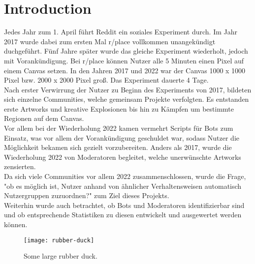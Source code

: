 \section{Introduction} \label{introduction}

Jedes Jahr zum 1. April f{\"u}hrt Reddit ein soziales Experiment durch. Im Jahr 2017 wurde dabei zum ersten Mal r/place vollkommen unangekündigt duchgeführt. Fünf Jahre später wurde das gleiche Experiment wiederholt, jedoch mit Vorankündigung. Bei r/place k{\"o}nnen Nutzer alle 5 Minuten einen Pixel auf einem Canvas setzen. In den Jahren 2017 und 2022 war der Canvas 1000 x 1000 Pixel bzw. 2000 x 2000 Pixel gro{\ss}. Das Experiment dauerte 4 Tage. \\
Nach erster Verwirrung der Nutzer zu Beginn des Experiments von 2017, bildeten sich einzelne Communities, welche gemeinsam Projekte verfolgten. Es entstanden erste Artworks und kreative Explosionen bis hin zu Kämpfen um bestimmte Regionen auf dem Canvas.\\
Vor allem bei der Wiederholung 2022 kamen vermehrt Scripts für Bots zum Einsatz, was vor allem der Vorankündigung geschuldet war, sodass Nutzer die Möglichkeit bekamen sich gezielt vorzubereiten. Anders als 2017, wurde die Wiederholung 2022 von Moderatoren begleitet, welche unerwünschte Artworks zensierten. \\
Da sich viele Communities vor allem 2022 zusammenschlossen, wurde die Frage, "ob es möglich ist, Nutzer anhand von ähnlicher Verhaltensweisen automatisch Nutzergruppen zuzuordnen?" zum Ziel dieses Projekts.\\
Weiterhin wurde auch betrachtet, ob Bots und Moderatoren identifizierbar sind und ob entsprechende Statistiken zu diesen entwickelt und ausgewertet werden können.
\begin{figure}[t]
    \centering
    \texttt{[image: rubber-duck]}
    \caption{Some large rubber duck.}
    \label{rubber-duck}
\end{figure}

